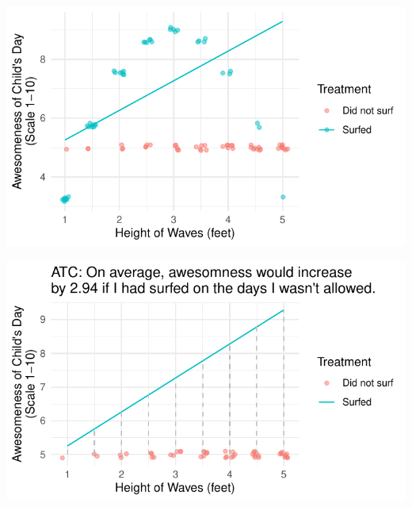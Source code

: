 \documentclass{beamer}
\begin{document}
\begin{frame}

\includegraphics[width = \textwidth]{figures/dr_bestFitLine}

\end{frame}

\begin{frame}

\includegraphics[width = \textwidth]{figures/dr_predictedEffects}

\end{frame}
\end{document}
